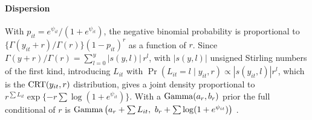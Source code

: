 \paragraph{Dispersion}
With $p_{it}=e^{\psi_{it}}/(1+e^{\psi_{it}})$, the negative binomial probability is proportional to $\{\Gamma(y_{it}+r)/\Gamma(r)\}(1-p_{it})^r$ as a function of $r$. Since $\Gamma(y+r)/\Gamma(r)=\sum_{l=0}^{y}|s(y,l)|\,r^l$, with $|s(y,l)|$ unsigned Stirling numbers of the first kind, introducing $L_{it}$ with $\Pr(L_{it}=l\mid y_{it},r)\propto|s(y_{it},l)|r^l$, which is the $\mathrm{CRT}(y_{it},r)$ distribution, gives a joint density proportional to $r^{\sum L_{it}}\exp\{-r\sum\log(1+e^{\psi_{it}})\}$. With a $\mathrm{Gamma}(a_r,b_r)$ prior the full conditional of $r$ is $\Gammad\left(a_r+\sum L_{it},\ b_r+\sum\log(1+e^{\psi_{it}})\right)$ \citep{zhou2015negative}.
